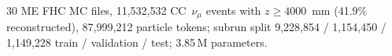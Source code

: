 30 ME FHC MC files, 11{,}532{,}532 CC~$\nu_\mu$ events with $z \ge 4000$~mm (41.9\% reconstructed), 87{,}999{,}212 particle tokens; subrun split 9{,}228{,}854 / 1{,}154{,}450 / 1{,}149{,}228 train / validation / test; 3.85\,M parameters.
